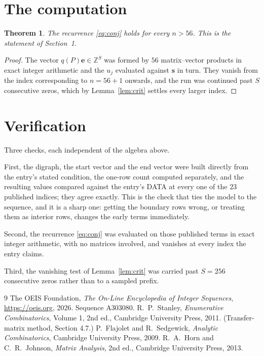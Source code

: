 \documentclass[11pt,a4paper]{article}
\theoremstyle{plain}
\newtheorem{theorem}{Theorem}
\theoremstyle{definition}
\begin{document}
\section{The computation}

\begin{theorem}
The recurrence \eqref{eq:conj} holds for every $n>56$. This is the statement of
Section~1.
\end{theorem}

\begin{proof}
The vector $q(P)\mathbf{e}\in\mathbb{Z}^{S}$ was formed by $56$ matrix--vector
products in exact integer arithmetic and the $u_j$ evaluated against $\mathbf{s}$ in turn.
They vanish from the index corresponding to $n=56+1$ onwards, and the run was continued
past $S$ consecutive zeros, which by Lemma~\ref{lem:crit} settles every larger index.
\end{proof}

\section{Verification}

Three checks, each independent of the algebra above.

First, the digraph, the start vector and the end vector were built directly from the
entry's stated condition, the one-row count computed separately, and the resulting values
compared against the entry's DATA at every one of the $23$ published indices; they
agree exactly. This is the check that ties the model to the sequence, and it is a sharp one:
getting the boundary rows wrong, or treating them as interior rows, changes the early terms
immediately.

Second, the recurrence \eqref{eq:conj} was evaluated on those published terms in exact
integer arithmetic, with no matrices involved, and vanishes at every index the entry claims.

Third, the vanishing test of Lemma~\ref{lem:crit} was carried past $S=256$ consecutive
zeros rather than to a sampled prefix.

\begin{thebibliography}{9}
 The OEIS Foundation, \emph{The On-Line Encyclopedia of Integer
Sequences}, \url{https://oeis.org}, 2026. Sequence A303080.
 R.~P.~Stanley, \emph{Enumerative Combinatorics}, Volume 1, 2nd ed.,
Cambridge University Press, 2011. (Transfer-matrix method, Section 4.7.)
 P.~Flajolet and R.~Sedgewick, \emph{Analytic Combinatorics}, Cambridge
University Press, 2009.
 R.~A.~Horn and C.~R.~Johnson, \emph{Matrix Analysis}, 2nd ed., Cambridge
University Press, 2013.
\end{thebibliography}
\end{document}

